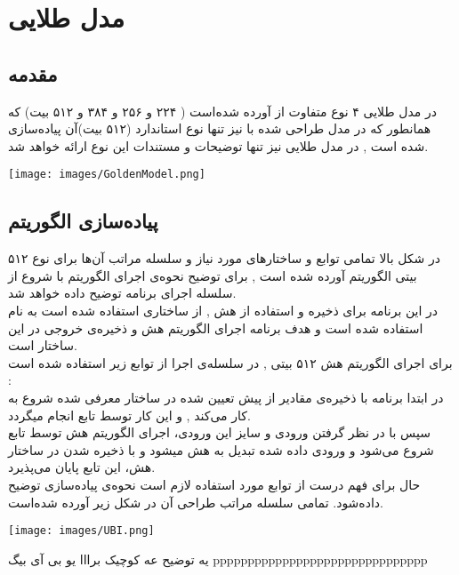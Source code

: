 \chapter{مدل طلایی}
\section{مقدمه}
در مدل‌ طلایی ۴ نوع متفاوت از  آورده شده‌است (‌ ۲۲۴ و ۲۵۶ و ۳۸۴ و ۵۱۲  بیت) که همانطور که در مدل  طراحی شده با  نیز تنها نوع استاندارد  (۵۱۲ بیت)آن پیاده‌سازی شده است , در مدل‌ طلایی نیز تنها توضیحات و مستندات این نوع ارائه خواهد شد.
\\
\begin{center}
	\texttt{[image: images/GoldenModel.png]}
\end{center}

\section{پیاده‌سازی الگوریتم}
در شکل بالا تمامی توابع و ساختارهای مورد نیاز  و سلسله مراتب آن‌ها برای نوع ۵۱۲ بیتی الگوریتم آورده شده است , برای توضیح نحوه‌ی اجرای الگوریتم با شروع از  
 سلسله اجرای برنامه توضیح داده خواهد شد.
\\
در این برنامه برای ‌ذخیره و استفاده از هش , از ساختاری استفاده شده است به نام \hyperref[subsec:sph-skein-big-context]{} استفاده شده است و هدف برنامه اجرای الگوریتم هش و ذخیره‌ی خروجی در این ساختار است.
\\
برای اجرای الگوریتم هش ۵۱۲ بیتی , در سلسله‌ی اجرا از توابع زیر استفاده شده است :
\\
در ابتدا برنامه با ذخیره‌ی مقادیر از پیش تعیین شده  \hyperref[subsec:IV512]{} در ساختار معرفی شده شروع به کار می‌کند , و این کار توسط تابع
\hyperref[subsec:sph-skein512-init]{}
   انجام میگردد.
  \\ سپس با در نظر گرفتن ورودی و سایز این ورودی، اجرای الگوریتم هش  توسط تابع \hyperref[subsec:sph-skein512]{}
   شروع می‌شود و ورودی داده شده تبدیل به هش میشود و با ذخیره شدن در ساختار  هش، این تابع پایان می‌پذیرد.
  \\ 
  حال برای فهم درست از توابع مورد استفاده لازم است نحوه‌ی پیاده‌سازی \hyperref[subsec:UBI-BIG]{} توضیح داده‌شود. تمامی سلسله مراتب طراحی آن در شکل زیر آورده شده‌است.
  \begin{center}
  		\texttt{[image: images/UBI.png]}	
  \end{center}
  
یه توضیح عه کوچیک برااا یو بی آی بیگ   ppppppppppppppppppppppppppppppp

